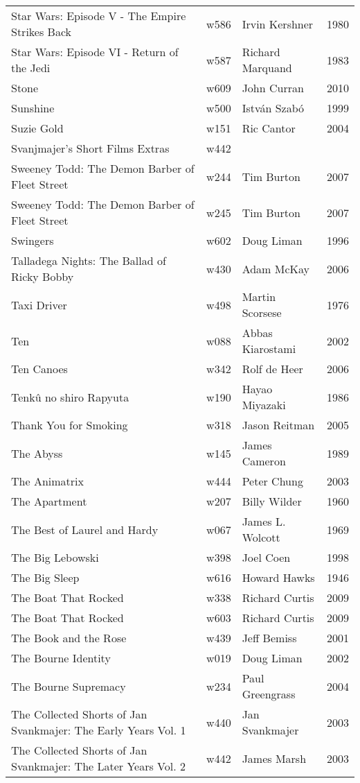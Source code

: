 \documentclass{article}
\begin{document}
\begin {center}
\begin{longtable}{p{10cm} l l l}
Star Wars: Episode V - The Empire Strikes Back & w586 & Irvin Kershner & 1980 \\
Star Wars: Episode VI - Return of the Jedi & w587 & Richard Marquand & 1983 \\
Stone & w609 & John Curran & 2010 \\
Sunshine & w500 & István Szabó & 1999 \\
Suzie Gold & w151 & Ric Cantor & 2004 \\
Svanjmajer's Short Films Extras & w442 &  &  \\
Sweeney Todd: The Demon Barber of Fleet Street & w244 & Tim Burton & 2007 \\
Sweeney Todd: The Demon Barber of Fleet Street & w245 & Tim Burton & 2007 \\
Swingers & w602 & Doug Liman & 1996 \\
Talladega Nights: The Ballad of Ricky Bobby & w430 & Adam McKay & 2006 \\
Taxi Driver & w498 & Martin Scorsese & 1976 \\
Ten & w088 & Abbas Kiarostami & 2002 \\
Ten Canoes & w342 & Rolf de Heer & 2006 \\
Tenkû no shiro Rapyuta & w190 & Hayao Miyazaki & 1986 \\
Thank You for Smoking & w318 & Jason Reitman & 2005 \\
The Abyss & w145 & James Cameron & 1989 \\
The Animatrix & w444 & Peter Chung & 2003 \\
The Apartment & w207 & Billy Wilder & 1960 \\
The Best of Laurel and Hardy & w067 & James L. Wolcott & 1969 \\
The Big Lebowski & w398 & Joel Coen & 1998 \\
The Big Sleep & w616 & Howard Hawks & 1946 \\
The Boat That Rocked & w338 & Richard Curtis & 2009 \\
The Boat That Rocked & w603 & Richard Curtis & 2009 \\
The Book and the Rose & w439 & Jeff Bemiss & 2001 \\
The Bourne Identity & w019 & Doug Liman & 2002 \\
The Bourne Supremacy & w234 & Paul Greengrass & 2004 \\
The Collected Shorts of Jan Svankmajer: The Early Years Vol. 1 & w440 & Jan Svankmajer & 2003 \\
The Collected Shorts of Jan Svankmajer: The Later Years Vol. 2 & w442 & James Marsh & 2003 \\

\end{longtable}
\end{center}
\end{document}
